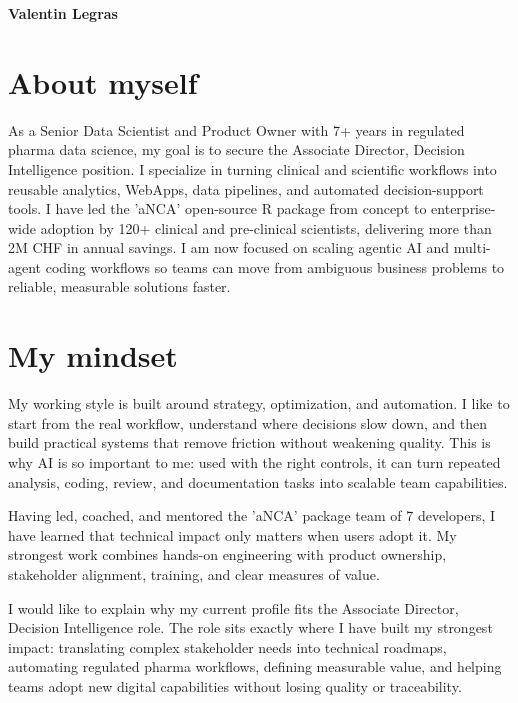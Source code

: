 \documentclass[11pt,a4paper]{article}
\newcommand{\Position}{Associate Director, Decision Intelligence}
\begin{document}
{\Large\bfseries\color{accent} Valentin Legras}\\[10pt]

\section{About myself}
As a Senior Data Scientist and Product Owner with 7+ years in regulated pharma
data science, my goal is to secure the \Position{} position. I specialize in
turning clinical and scientific workflows into reusable analytics, WebApps, data
pipelines, and automated decision-support tools. I have led the 'aNCA'
open-source R package from concept to enterprise-wide adoption by 120+ clinical
and pre-clinical scientists, delivering more than 2M CHF in annual savings. I am
now focused on scaling agentic AI and multi-agent coding workflows so teams can
move from ambiguous business problems to reliable, measurable solutions faster.

\section{My mindset}
My working style is built around strategy, optimization, and automation. I like
to start from the real workflow, understand where decisions slow down, and then
build practical systems that remove friction without weakening quality. This is
why AI is so important to me: used with the right controls, it can turn repeated
analysis, coding, review, and documentation tasks into scalable team
capabilities.

Having led, coached, and mentored the 'aNCA' package team of 7 developers, I
have learned that technical impact only matters when users adopt it. My strongest
work combines hands-on engineering with product ownership, stakeholder alignment,
training, and clear measures of value.

I would like to explain why my current profile fits the \Position{} role. The
role sits exactly where I have built my strongest impact: translating complex
stakeholder needs into technical roadmaps, automating regulated pharma
workflows, defining measurable value, and helping teams adopt new digital
capabilities without losing quality or traceability.
\end{document}

